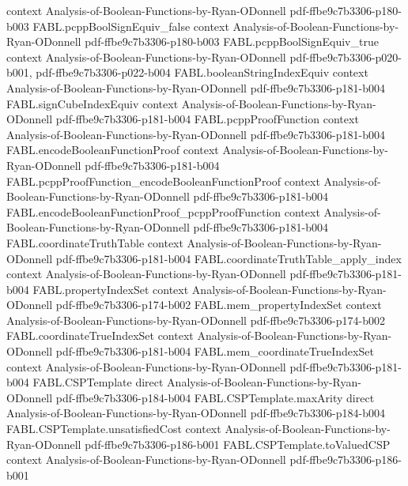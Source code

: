 \begin{theorem}
  {context}
  {Analysis-of-Boolean-Functions-by-Ryan-ODonnell}
  {pdf-ffbe9c7b3306-p180-b003}
\proofstep
  {FABL.pcppBoolSignEquiv_false}
  {context}
  {Analysis-of-Boolean-Functions-by-Ryan-ODonnell}
  {pdf-ffbe9c7b3306-p180-b003}
\proofstep
  {FABL.pcppBoolSignEquiv_true}
  {context}
  {Analysis-of-Boolean-Functions-by-Ryan-ODonnell}
  {pdf-ffbe9c7b3306-p020-b001,
    pdf-ffbe9c7b3306-p022-b004}
\proofstep
  {FABL.booleanStringIndexEquiv}
  {context}
  {Analysis-of-Boolean-Functions-by-Ryan-ODonnell}
  {pdf-ffbe9c7b3306-p181-b004}
\proofstep
  {FABL.signCubeIndexEquiv}
  {context}
  {Analysis-of-Boolean-Functions-by-Ryan-ODonnell}
  {pdf-ffbe9c7b3306-p181-b004}
\proofstep
  {FABL.pcppProofFunction}
  {context}
  {Analysis-of-Boolean-Functions-by-Ryan-ODonnell}
  {pdf-ffbe9c7b3306-p181-b004}
\proofstep
  {FABL.encodeBooleanFunctionProof}
  {context}
  {Analysis-of-Boolean-Functions-by-Ryan-ODonnell}
  {pdf-ffbe9c7b3306-p181-b004}
\proofstep
  {FABL.pcppProofFunction_encodeBooleanFunctionProof}
  {context}
  {Analysis-of-Boolean-Functions-by-Ryan-ODonnell}
  {pdf-ffbe9c7b3306-p181-b004}
\proofstep
  {FABL.encodeBooleanFunctionProof_pcppProofFunction}
  {context}
  {Analysis-of-Boolean-Functions-by-Ryan-ODonnell}
  {pdf-ffbe9c7b3306-p181-b004}
\proofstep
  {FABL.coordinateTruthTable}
  {context}
  {Analysis-of-Boolean-Functions-by-Ryan-ODonnell}
  {pdf-ffbe9c7b3306-p181-b004}
\proofstep
  {FABL.coordinateTruthTable_apply_index}
  {context}
  {Analysis-of-Boolean-Functions-by-Ryan-ODonnell}
  {pdf-ffbe9c7b3306-p181-b004}
\proofstep
  {FABL.propertyIndexSet}
  {context}
  {Analysis-of-Boolean-Functions-by-Ryan-ODonnell}
  {pdf-ffbe9c7b3306-p174-b002}
\proofstep
  {FABL.mem_propertyIndexSet}
  {context}
  {Analysis-of-Boolean-Functions-by-Ryan-ODonnell}
  {pdf-ffbe9c7b3306-p174-b002}
\proofstep
  {FABL.coordinateTrueIndexSet}
  {context}
  {Analysis-of-Boolean-Functions-by-Ryan-ODonnell}
  {pdf-ffbe9c7b3306-p181-b004}
\proofstep
  {FABL.mem_coordinateTrueIndexSet}
  {context}
  {Analysis-of-Boolean-Functions-by-Ryan-ODonnell}
  {pdf-ffbe9c7b3306-p181-b004}
\proofstep
  {FABL.CSPTemplate}
  {direct}
  {Analysis-of-Boolean-Functions-by-Ryan-ODonnell}
  {pdf-ffbe9c7b3306-p184-b004}
\proofstep
  {FABL.CSPTemplate.maxArity}
  {direct}
  {Analysis-of-Boolean-Functions-by-Ryan-ODonnell}
  {pdf-ffbe9c7b3306-p184-b004}
\proofstep
  {FABL.CSPTemplate.unsatisfiedCost}
  {context}
  {Analysis-of-Boolean-Functions-by-Ryan-ODonnell}
  {pdf-ffbe9c7b3306-p186-b001}
\proofstep
  {FABL.CSPTemplate.toValuedCSP}
  {context}
  {Analysis-of-Boolean-Functions-by-Ryan-ODonnell}
  {pdf-ffbe9c7b3306-p186-b001}

\end{theorem}
